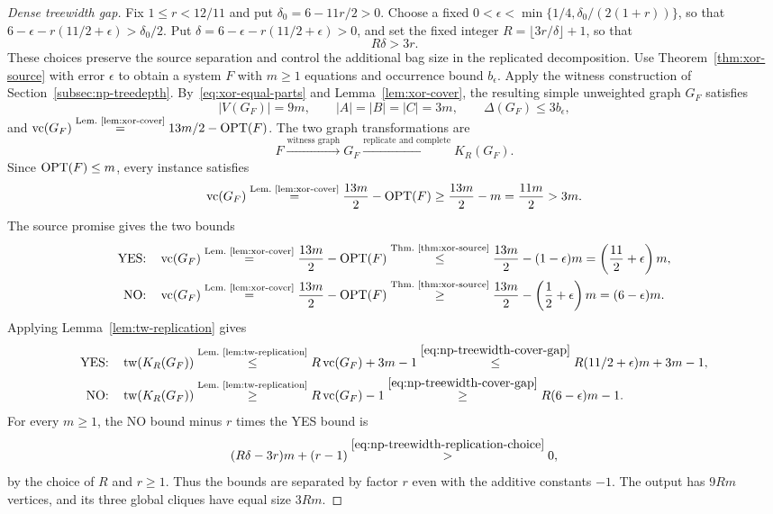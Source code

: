 \begin{proof}[Dense treewidth gap]
Fix $1\le r<12/11$ and put $\delta_0=6-11r/2>0$.
Choose a fixed
$0<\epsilon<\min\{1/4,\delta_0/(2(1+r))\}$, so that
$6-\epsilon-r(11/2+\epsilon)>\delta_0/2$. Put
$\delta=6-\epsilon-r(11/2+\epsilon)>0$, and set the fixed integer
$R=\lfloor3r/\delta\rfloor+1$, so that
\begin{equation}\label{eq:np-treewidth-replication-choice}
 R\delta>3r.
\end{equation}
These choices preserve the source separation and control the
additional bag size in the replicated decomposition.
Use Theorem~\ref{thm:xor-source} with error $\epsilon$ to obtain
a system $F$ with $m\ge1$ equations and occurrence bound $b_\epsilon$.
Apply the witness construction of
Section~\ref{subsec:np-treedepth}. By~\eqref{eq:xor-equal-parts} and
Lemma~\ref{lem:xor-cover}, the resulting simple unweighted graph
$G_F$ satisfies
\[
 |V(G_F)|=9m,\qquad |A|=|B|=|C|=3m,\qquad
 \Delta(G_F)\leq3b_\epsilon,
\]
and
$\operatorname{vc}(G_F)\overset{\text{Lem.~\ref{lem:xor-cover}}}{=}13m/2-\operatorname{OPT}(F)$.
The two graph transformations are
\[
 F\xrightarrow{\text{witness graph}}G_F
 \xrightarrow{\text{replicate and complete}}K_R(G_F).
\]
Since $\operatorname{OPT}(F)\leq m$, every instance satisfies
\[
 \operatorname{vc}(G_F)\overset{\text{Lem.~\ref{lem:xor-cover}}}{=}
 \frac{13m}{2}-\operatorname{OPT}(F)\geq\frac{13m}{2}-m=\frac{11m}{2}>3m.
\]
The source promise gives the two bounds
\begin{equation}\label{eq:np-treewidth-cover-gap}
\begin{aligned}
 \textup{YES:}\quad
 \operatorname{vc}(G_F)&\overset{\text{Lem.~\ref{lem:xor-cover}}}{=}
    \frac{13m}{2}-\operatorname{OPT}(F)
  \overset{\text{Thm.~\ref{thm:xor-source}}}{\leq}
    \frac{13m}{2}-(1-\epsilon)m
 =\left(\frac{11}{2}+\epsilon\right)m,\\
 \textup{NO:}\quad
 \operatorname{vc}(G_F)&\overset{\text{Lem.~\ref{lem:xor-cover}}}{=}
    \frac{13m}{2}-\operatorname{OPT}(F)
  \overset{\text{Thm.~\ref{thm:xor-source}}}{\geq}
    \frac{13m}{2}-\left(\frac12+\epsilon\right)m
 =(6-\epsilon)m.\end{aligned}
\end{equation}
Applying Lemma~\ref{lem:tw-replication} gives
\[
 \begin{aligned}
 \textup{YES:}\quad\operatorname{tw}(K_R(G_F))
   &\overset{\text{Lem.~\ref{lem:tw-replication}}}{\leq}
       R\operatorname{vc}(G_F)+3m-1
  \overset{\eqref{eq:np-treewidth-cover-gap}}{\leq}
       R(11/2+\epsilon)m+3m-1,\\
 \textup{NO:}\quad\operatorname{tw}(K_R(G_F))
   &\overset{\text{Lem.~\ref{lem:tw-replication}}}{\geq}
       R\operatorname{vc}(G_F)-1
 \overset{\eqref{eq:np-treewidth-cover-gap}}{\geq}
       R(6-\epsilon)m-1.
 \end{aligned}
\]
For every $m\ge1$, the NO bound minus $r$ times the YES bound is
\[
 (R\delta-3r)m+(r-1)
 \overset{\eqref{eq:np-treewidth-replication-choice}}{>}0,
\]
by the choice of $R$ and $r\ge1$. Thus the bounds are separated by
factor $r$ even with the additive constants $-1$.
The output has $9Rm$ vertices, and its three global cliques have
equal size $3Rm$. 
\end{proof}


